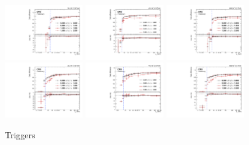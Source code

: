 \begin{figure}[tb]
	\begin{center}
		\includegraphics[width=0.30\textwidth]{fig/SFs/2016_ele_trg1_1D.pdf}
		\includegraphics[width=0.30\textwidth]{fig/SFs/2017_ele_trg1_1D.pdf}
		\includegraphics[width=0.30\textwidth]{fig/SFs/2018_ele_trg1_1D.pdf}
		\includegraphics[width=0.30\textwidth]{fig/SFs/2016_ele_trg2_1D.pdf}
		\includegraphics[width=0.30\textwidth]{fig/SFs/2017_ele_trg2_1D.pdf}
		\includegraphics[width=0.30\textwidth]{fig/SFs/2018_ele_trg2_1D.pdf}
	\end{center}
	\caption{Triggers}
	\label{fig:ele_trig_SF}
\end{figure}

